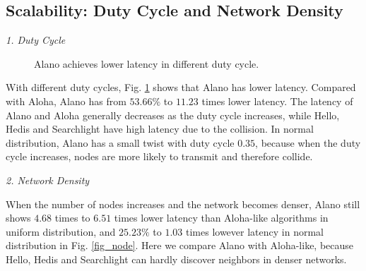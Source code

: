\subsection{Scalability: Duty Cycle and Network Density}

\emph{1. Duty Cycle} 
\begin{figure}[!h]
\centering
{}
\hspace{0.01in}
\caption{Alano achieves lower latency in different duty cycle.}
\label{fig_dutycycle}
\end{figure}

With different duty cycles, Fig. \ref{fig_dutycycle} shows that Alano has lower latency. Compared with Aloha, Alano has from $53.66\%$ to $11.23$ times lower latency. The latency of Alano and Aloha generally decreases as the duty cycle increases, while Hello, Hedis and Searchlight have high latency due to the collision. In normal distribution, Alano has a small twist with duty cycle $0.35$, because when the duty cycle increases, nodes are more likely to transmit and therefore collide.

\emph{2. Network Density} 


When the number of nodes increases and the network becomes denser, Alano still shows $4.68$ times to $6.51$ times lower latency than Aloha-like algorithms in uniform distribution, and $25.23\%$ to $1.03$ times lowever latency in normal distribution in Fig. \ref{fig_node}. Here we compare Alano with Aloha-like, because Hello, Hedis and Searchlight can hardly discover neighbors in denser networks. 

